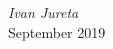 \documentclass[graybox,envcountchap,sectrefs]{svmono}
\begin{document}


%
%
%
 

\vspace{\baselineskip}
\begin{flushright}\noindent
\hfill {\it Ivan  Jureta}\\
September 2019\hfill {\it }\\
\end{flushright}





%

\tableofcontents

%

\mainmatter
\end{document}
